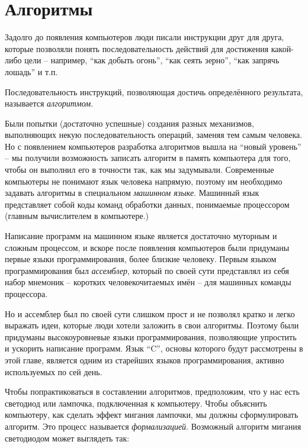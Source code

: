 \documentclass[../sparc.tex]{subfiles}
\begin{document}
\section{Алгоритмы}

Задолго до появления компьютеров люди писали инструкции друг для друга, которые
позволяли понять последовательность действий для достижения какой-либо цели --
например, ``как добыть огонь'', ``как сеять зерно'', ``как запрячь лошадь'' и
т.п.

Последовательность инструкций, позволяющая достичь определённого результата,
называется \emph{алгоритмом}.

Были попытки (достаточно успешные) создания разных механизмов, выполняющих некую
последовательность операций, заменяя тем самым человека.  Но с появлением
компьютеров разработка алгоритмов вышла на ``новый уровень'' -- мы получили
возможность записать алгоритм в память компьютера для того, чтобы он выполнил
его в точности так, как мы задумывали.  Современные компьютеры не понимают язык
человека напрямую, поэтому им необходимо задавать алгоритмы в специальном
\emph{машинном языке}.  Машинный язык представляет собой коды команд обработки
данных, понимаемые процессором (главным вычислителем в компьютере.)

Написание программ на машинном языке является достаточно муторным и сложным
процессом, и вскоре после появления компьютеров были придуманы первые языки
программирования, более близкие человеку.  Первым языком программирования был
\emph{ассемблер}, который по своей сути представлял из себя набор мнемоник --
коротких человекочитаемых имён -- для машинных команды процессора.

Но и ассемблер был по своей сути слишком прост и не позволял кратко и легко
выражать идеи, которые люди хотели заложить в свои алгоритмы.  Поэтому были
придуманы высокоуровневые языки программирования, позволяющие упростить и
ускорить написание программ.  Язык ``C'', основы которого будут рассмотрены в
этой главе, является одним из старейших языков программирования, активно
используемых по сей день.

Чтобы попрактиковаться в составлении алгоритмов, предположим, что у нас есть
светодиод или лампочка, подключенная к компьютеру.  Чтобы объяснить компьютеру,
как сделать эффект мигания лампочки, мы должны сформулировать алгоритм.  Это
процесс называется \emph{формализацией}.  Возможный алгоритм мигания светодиодом
может выглядеть так:
\end{document}
